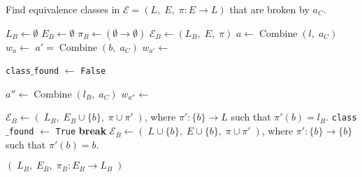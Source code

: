 \begin{algorithm}[H]
\caption{
Find equivalence classes in $\mathcal{E} = (L, \; E, \; \pi: E \to L)$ that are broken by $a_{C}$.
}
\hrulefill
\begin{algorithmic}[1]
    \State $L_{B} \gets \emptyset$
    \State $E_{B} \gets \emptyset$
    \State $\pi_{B} \gets (\emptyset \to \emptyset)$
    \State $\mathcal{E}_{B} \gets (L_{B}, \; E, \; \pi)$
        \State $a \gets \operatorname{Combine}(l, \; a_{C})$
        \State $w_{a} \gets$ 
            \State $a' = \operatorname{Combine}(b, \; a_{C})$
            \State $w_{a'} \gets$ 
            
                \Statex {}
                \State \texttt{class$\_$found} $\gets$ \texttt{False}
                
                    \State $a'' \gets \operatorname{Combine}(l_{B}, \; a_{C})$
                    \State $w_{a''} \gets$ 

                        \Statex {}
                        \State $\mathcal{E}_{B} \gets ( \; L_{B}, \; E_{B} \cup \{b\}, \; \pi \cup \pi' \; )$, where $\pi': \{b\} \to L$ such that $\pi'(b) = l_{B}$.
                        \State \texttt{class$\_$found} $\gets$ \texttt{True}
                        \State \textbf{break}
                    \EndIf
                \EndFor
                    \Statex {}
                    \State $\mathcal{E}_{B} \gets (\; L \cup \{b\}, \; E \cup \{b\}, \; \pi \cup \pi' \;)$, where $\pi': \{b\} \to \{b\}$ such that $\pi'(b) = b$.
                \EndIf
            \EndIf
        \EndFor
    \EndFor

    \State \Return $( \; L_{B}, \; E_{B}, \; \pi_{B}: E_{B} \to L_{B} \; )$
\EndProcedure
\end{algorithmic}
\end{algorithm}

